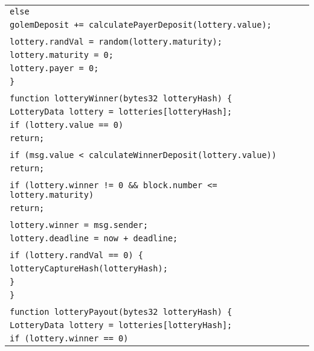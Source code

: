 \documentclass[a4paper]{article}
\begin{document}
\begin{tabularx}{\linewidth}{l}
        \qquad\qquad\texttt{else}\\
        \qquad\qquad\qquad\texttt{golemDeposit += calculatePayerDeposit(lottery.value);}\\
        \\
        \qquad\qquad\texttt{lottery.randVal = random(lottery.maturity);}\\
        \qquad\qquad\texttt{lottery.maturity = 0;}\\
        \qquad\qquad\texttt{lottery.payer = 0;}\\
        \qquad\texttt{\}}\\
        \\
        \qquad\texttt{function lotteryWinner(bytes32 lotteryHash) \{}\\
        \qquad\qquad\texttt{LotteryData lottery = lotteries[lotteryHash];}\\
        \qquad\qquad\texttt{if (lottery.value == 0)}\\
        \qquad\qquad\qquad\texttt{return;}\\
        \\
        \qquad\qquad\texttt{if (msg.value < calculateWinnerDeposit(lottery.value))}\\
        \qquad\qquad\qquad\texttt{return;}\\
        \\
        \qquad\qquad\texttt{if (lottery.winner != 0 \&\& block.number <= lottery.maturity)}\\
        \qquad\qquad\qquad\texttt{return;}\\
        \\
        \qquad\qquad\texttt{lottery.winner = msg.sender;}\\
        \qquad\qquad\texttt{lottery.deadline = now + deadline;}\\
        \\
        \qquad\qquad\texttt{if (lottery.randVal == 0) \{}\\
        \qquad\qquad\qquad\texttt{lotteryCaptureHash(lotteryHash);}\\
        \qquad\qquad\texttt{\}}\\
        \qquad\texttt{\}}\\
        \\
        \qquad\texttt{function lotteryPayout(bytes32 lotteryHash) \{}\\
        \qquad\qquad\texttt{LotteryData lottery = lotteries[lotteryHash];}\\
        \qquad\qquad\texttt{if (lottery.winner == 0)}\\

\end{tabularx}
\end{document}
